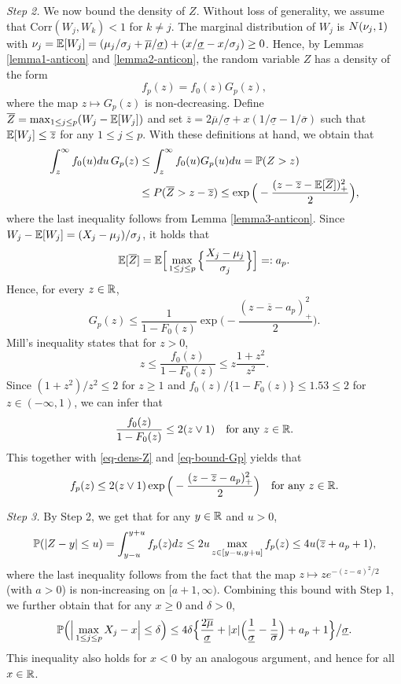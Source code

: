 \textit{Step 2.} We now bound the density of $Z$. Without loss of generality, we assume that $\text{Corr}(W_j,W_k) < 1$ for $k \ne j$. The marginal distribution of $W_j$ is $N(\nu_j,1)$ with $\nu_j = \mathbb{E}[W_j] = (\mu_j/\sigma_j + \overline{\mu}/{\underline{\sigma}}) + (x/\underline{\sigma} - x/\sigma_j) \ge 0$. Hence, by Lemmas \ref{lemma1-anticon} and \ref{lemma2-anticon}, the random variable $Z$ has a density of the form
\begin{equation}\label{eq-dens-Z}
f_p(z) = f_0(z) G_p(z), 
\end{equation}
where the map $z \mapsto G_p(z)$ is non-decreasing. Define $\overline{Z} = \max_{1 \le j \le p} (W_j - \mathbb{E}[W_j])$ and set $\overline{z} = 2 \overline{\mu}/\underline{\sigma} + x(1/\underline{\sigma} - 1/\overline{\sigma})$ such that $\mathbb{E}[W_j] \le \overline{z}$ for any $1 \le j \le p$. With these definitions at hand, we obtain that  
\begin{align*}
\int_z^{\infty} f_0(u)du \, G_p(z) & \le \int_z^{\infty} f_0(u) G_p(u) du = \mathbb{P}(Z > z) \\ 
 & \le P(\overline{Z} > z - \overline{z}) \le \exp \Big( - \frac{(z - \overline{z} - \mathbb{E}[\overline{Z}])^2_+}{2} \Big), 
\end{align*}
where the last inequality follows from Lemma \ref{lemma3-anticon}. Since $W_j - \mathbb{E}[W_j] = (X_j - \mu_j)/\sigma_j$, it holds that 
\[ \mathbb{E}[\overline{Z}] = \mathbb{E} \Big[ \max_{1 \le j \le p} \Big\{ \frac{X_j-\mu_j}{\sigma_j} \Big\} \Big] =: a_p. \]
Hence, for every $z \in \mathbb{R}$, 
\begin{equation}\label{eq-bound-Gp}
G_p(z) \le \frac{1}{1 - F_0(z)} \exp\Big( - \frac{(z - \overline{z} - a_p)_+^2}{2} \Big). 
\end{equation}
Mill's inequality states that for $z > 0$, 
\[ z \le \frac{f_0(z)}{1-F_0(z)} \le z \frac{1+z^2}{z^2}. \]
Since $(1+z^2)/z^2 \le 2$ for $z \ge 1$ and $f_0(z)/\{1-F_0(z)\} \le 1.53 \le 2$ for $z \in (-\infty,1)$, we can infer that
\[ \frac{f_0(z)}{1-F_0(z)} \le 2 (z \vee 1) \quad \text{for any } z \in \mathbb{R}. \]
This together with \eqref{eq-dens-Z} and \eqref{eq-bound-Gp} yields that
\[ f_p(z) \le 2 (z \vee 1)  \exp\Big( - \frac{(z - \overline{z} - a_p)_+^2}{2} \Big) \quad \text{for any } z \in \mathbb{R}. \]
 

\textit{Step 3.} By Step 2, we get that for any $y \in \mathbb{R}$ and $u > 0$, 
\[ \mathbb{P}( |Z - y| \le u) = \int_{y - u}^{y + u} f_p(z) dz \le 2u \max_{z \in [y-u,y+u]} f_p(z) \le 4u (\overline{z} + a_p + 1), \] 
where the last inequality follows from the fact that the map $z \mapsto z e^{-(z-a)^2/2}$ (with $a > 0$) is non-increasing on $[a+1,\infty)$. Combining this bound with Step 1, we further obtain that for any $x \ge 0$ and $\delta > 0$, 
\begin{equation}\label{eq-bound1-Levy}
\mathbb{P} \Big( \Big| \max_{1 \le j \le p} X_j - x \Big| \le \delta \Big) \le 4\delta \Big\{ \frac{2\overline{\mu}}{\underline{\sigma}} + |x| \Big(\frac{1}{\underline{\sigma}} - \frac{1}{\overline{\sigma}}\Big) + a_p + 1 \Big\} \big/ \underline{\sigma}. 
\end{equation} 
This inequality also holds for $x < 0$ by an analogous argument, and hence for all $x \in \mathbb{R}$. 


